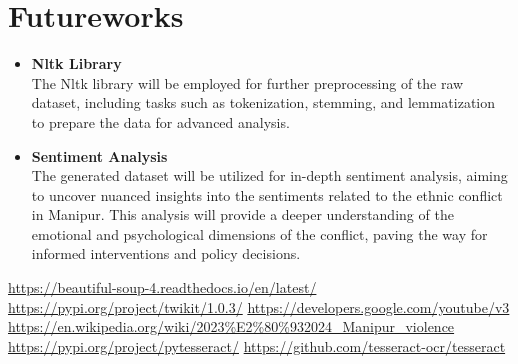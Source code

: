 \documentclass{report}
\begin{document}
\newpage
\vspace*{3pt}
\section{Futureworks}
\begin{itemize}
    \item \textbf{Nltk Library} 
    \\The Nltk library will be employed for further preprocessing of the raw dataset, including tasks such as tokenization, stemming, and lemmatization to prepare the data for advanced analysis.
    \item \textbf{Sentiment Analysis}
    \\The generated dataset will be utilized for in-depth sentiment analysis, aiming to uncover nuanced insights into the sentiments related to the ethnic conflict in Manipur. This analysis will provide a deeper understanding of the emotional and psychological dimensions of the conflict, paving the way for informed interventions and policy decisions.
\end{itemize}










\vspace*{3pt}
\begin{thebibliography}{6}
 \url{https://beautiful-soup-4.readthedocs.io/en/latest/}
 \url{https://pypi.org/project/twikit/1.0.3/}
 \url{https://developers.google.com/youtube/v3}
 \url{https://en.wikipedia.org/wiki/2023%E2%80%932024_Manipur_violence}
 \url{https://pypi.org/project/pytesseract/}
 \url{https://github.com/tesseract-ocr/tesseract}
\end{thebibliography}
\end{document}
